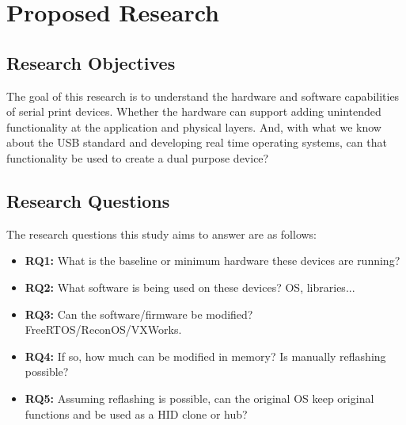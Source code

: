 \chapter{\leavevmode Proposed Research}
\label{chap:proposedresearch}



\section{Research Objectives }

The goal of this research is to understand the hardware and software capabilities of serial print devices. Whether the hardware can support adding unintended functionality at the application and physical layers. And, with what we know about the USB standard and developing real time operating systems, can that functionality be used to create a dual purpose device?


\section{Research Questions}

The research questions this study aims to answer are as follows:

\begin{itemize}
  \item \textbf{RQ1:} What is the baseline or minimum hardware these devices are running?
  \item \textbf{RQ2:} What software is being used on these devices? OS, libraries...
  \item \textbf{RQ3:} Can the software/firmware be modified? FreeRTOS/ReconOS/VXWorks.
  \item \textbf{RQ4:} If so, how much can be modified in memory? Is manually reflashing possible?
  \item \textbf{RQ5:} Assuming reflashing is possible, can the original OS keep original functions and be used as a HID clone or hub?
\end{itemize}



